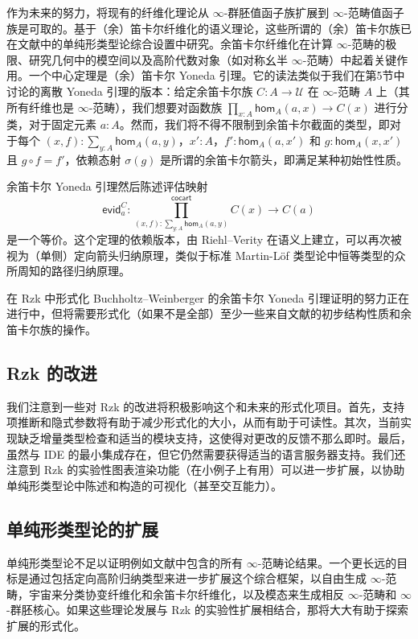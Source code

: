 \documentclass[12pt,a4paper]{article}
\theoremstyle{definition}
\theoremstyle{definition}
\begin{document}
作为未来的努力，将现有的纤维化理论从 $\infty$-群胚值函子族扩展到 $\infty$-范畴值函子族是可取的。基于（余）笛卡尔纤维化的语义理论，这些所谓的（余）笛卡尔族已在文献中的单纯形类型论综合设置中研究。余笛卡尔纤维化在计算 $\infty$-范畴的极限、研究几何中的模空间以及高阶代数对象（如对称幺半 $\infty$-范畴）中起着关键作用。一个中心定理是（余）笛卡尔 Yoneda 引理。它的读法类似于我们在第5节中讨论的离散 Yoneda 引理的版本：给定余笛卡尔族 $C:A \to \mathcal{U}$ 在 $\infty$-范畴 $A$ 上（其所有纤维也是 $\infty$-范畴），我们想要对函数族 $\prod_{x:A} \mathsf{hom}_A(a,x) \to C(x)$ 进行分类，对于固定元素 $a:A$。然而，我们将不得不限制到余笛卡尔截面的类型，即对于每个 $(x,f):\sum_{y:A} \mathsf{hom}_A(a,y)$，$x':A$，$f':\mathsf{hom}_A(a,x')$ 和 $g:\mathsf{hom}_A(x,x')$ 且 $g \circ f = f'$，依赖态射 $\sigma(g)$ 是所谓的余笛卡尔箭头，即满足某种初始性性质。

余笛卡尔 Yoneda 引理然后陈述评估映射
\[
\mathsf{evid}^C_a : \prod^{\mathsf{cocart}}_{(x,f):\sum_{y:A}\mathsf{hom}_A(a,y)} C(x) \to C(a)
\]
是一个等价。这个定理的依赖版本，由 Riehl--Verity 在语义上建立，可以再次被视为（单侧）定向箭头归纳原理，类似于标准 Martin-L\"of 类型论中恒等类型的众所周知的路径归纳原理。

在 Rzk 中形式化 Buchholtz--Weinberger 的余笛卡尔 Yoneda 引理证明的努力正在进行中，但将需要形式化（如果不是全部）至少一些来自文献的初步结构性质和余笛卡尔族的操作。

\subsection{Rzk 的改进}

我们注意到一些对 Rzk 的改进将积极影响这个和未来的形式化项目。首先，支持项推断和隐式参数将有助于减少形式化的大小，从而有助于可读性。其次，当前实现缺乏增量类型检查和适当的模块支持，这使得对更改的反馈不那么即时。最后，虽然与 IDE 的最小集成存在，但它仍然需要获得适当的语言服务器支持。我们还注意到 Rzk 的实验性图表渲染功能（在小例子上有用）可以进一步扩展，以协助单纯形类型论中陈述和构造的可视化（甚至交互能力）。

\subsection{单纯形类型论的扩展}

单纯形类型论不足以证明例如文献中包含的所有 $\infty$-范畴论结果。一个更长远的目标是通过包括定向高阶归纳类型来进一步扩展这个综合框架，以自由生成 $\infty$-范畴，宇宙来分类协变纤维化和余笛卡尔纤维化，以及模态来生成相反 $\infty$-范畴和 $\infty$-群胚核心。如果这些理论发展与 Rzk 的实验性扩展相结合，那将大大有助于探索扩展的形式化。
\end{document}
